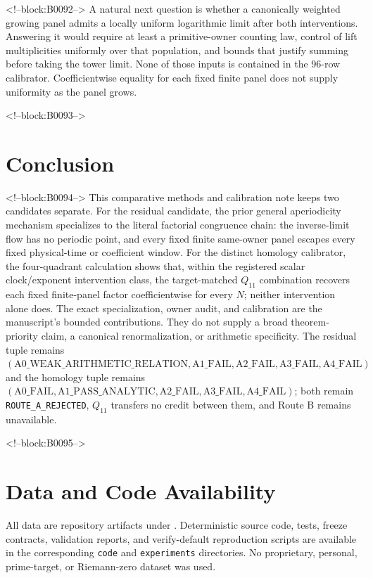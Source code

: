 \documentclass[11pt]{article}
\theoremstyle{definition}
\theoremstyle{remark}
\begin{document}
<!--block:B0092-->
A natural next question is whether a canonically weighted growing panel admits a locally uniform logarithmic limit after both interventions. Answering it would require at least a primitive-owner counting law, control of lift multiplicities uniformly over that population, and bounds that justify summing before taking the tower limit. None of those inputs is contained in the 96-row calibrator. Coefficientwise equality for each fixed finite panel does not supply uniformity as the panel grows.

<!--block:B0093-->
\section{Conclusion}

<!--block:B0094-->
This comparative methods and calibration note keeps two candidates separate. For the residual candidate, the prior general aperiodicity mechanism specializes to the literal factorial congruence chain: the inverse-limit flow has no periodic point, and every fixed finite same-owner panel escapes every fixed physical-time or coefficient window. For the distinct homology calibrator, the four-quadrant calculation shows that, within the registered scalar clock/exponent intervention class, the target-matched $Q_{11}$ combination recovers each fixed finite-panel factor coefficientwise for every $N$; neither intervention alone does. The exact specialization, owner audit, and calibration are the manuscript's bounded contributions. They do not supply a broad theorem-priority claim, a canonical renormalization, or arithmetic specificity. The residual tuple remains $(\mathrm{A0\_WEAK\_ARITHMETIC\_RELATION},\mathrm{A1\_FAIL},\mathrm{A2\_FAIL},\mathrm{A3\_FAIL},\mathrm{A4\_FAIL})$ and the homology tuple remains $(\mathrm{A0\_FAIL},\mathrm{A1\_PASS\_ANALYTIC},\mathrm{A2\_FAIL},\mathrm{A3\_FAIL},\mathrm{A4\_FAIL})$; both remain \texttt{ROUTE\_A\_REJECTED}, $Q_{11}$ transfers no credit between them, and Route B remains unavailable.

<!--block:B0095-->
\section*{Data and Code Availability}
All data are repository artifacts under . Deterministic source code, tests, freeze contracts, validation reports, and verify-default reproduction scripts are available in the corresponding \texttt{code} and \texttt{experiments} directories. No proprietary, personal, prime-target, or Riemann-zero dataset was used.
\end{document}
